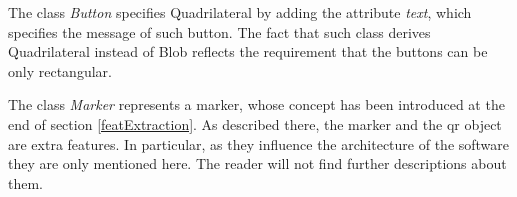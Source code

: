 	The class \emph{Button} specifies Quadrilateral by adding the attribute \emph{text}, which specifies the message of such button. The fact that such class derives Quadrilateral instead of Blob reflects the requirement that the buttons can be only rectangular. 
	
	The class \emph{Marker} represents a marker, whose concept has been introduced at the end of section \ref{featExtraction}. As described there, the marker and the \mbox{qr} object are extra features. In particular, as they influence the architecture of the software they are only mentioned here. The reader will not find further descriptions about them.

		


